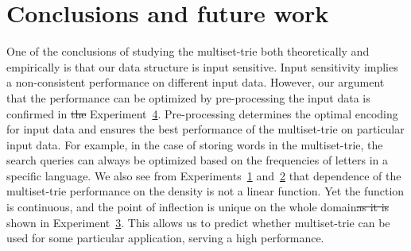 \documentclass[10pt,letterpaper]{article}
\providecommand{\DIFaddtex}[1]{{\protect\color{blue}\uwave{#1}}} %
\providecommand{\DIFdeltex}[1]{{\protect\color{red}\sout{#1}}}                      %
\providecommand{\DIFaddbegin}{} %
\providecommand{\DIFaddend}{} %
\providecommand{\DIFdelbegin}{} %
\providecommand{\DIFdelend}{} %
\providecommand{\DIFadd}[1]{\texorpdfstring{\DIFaddtex{#1}}{#1}} %
\providecommand{\DIFdel}[1]{\texorpdfstring{\DIFdeltex{#1}}{}} %
\newcommand{\DIFscaledelfig}{0.5}
\newlength{\DIFdelgraphicswidth} %
\newlength{\DIFdelgraphicsheight} %
\newcommand{\DIFaddincludegraphics}[2][]{{\color{blue}\fbox{\DIFOincludegraphics[#1]{#2}}}} %
\newcommand{\DIFdelincludegraphics}[2][]{%
\sbox{\DIFdelgraphicsbox}{\DIFOincludegraphics[#1]{#2}}%
\settoboxwidth{\DIFdelgraphicswidth}{\DIFdelgraphicsbox} %
\settoboxtotalheight{\DIFdelgraphicsheight}{\DIFdelgraphicsbox} %
\scalebox{\DIFscaledelfig}{%
\parbox[b]{\DIFdelgraphicswidth}{\usebox{\DIFdelgraphicsbox}\\[-\baselineskip] \rule{\DIFdelgraphicswidth}{0em}}\llap{\resizebox{\DIFdelgraphicswidth}{\DIFdelgraphicsheight}{%
\setlength{\unitlength}{\DIFdelgraphicswidth}%
\begin{picture}(1,1)%
\thicklines\linethickness{2pt} %
{\color[rgb]{1,0,0}\put(0,0){\framebox(1,1){}}}%
{\color[rgb]{1,0,0}\put(0,0){\line( 1,1){1}}}%
{\color[rgb]{1,0,0}\put(0,1){\line(1,-1){1}}}%
\end{picture}%
}\hspace*{3pt}}} %
} %
\DeclareRobustCommand{\DIFaddbegin}{\DIFOaddbegin \let\includegraphics\DIFaddincludegraphics} %
\DeclareRobustCommand{\DIFaddend}{\DIFOaddend \let\includegraphics\DIFOincludegraphics} %
\DeclareRobustCommand{\DIFdelbegin}{\DIFOdelbegin \let\includegraphics\DIFdelincludegraphics} %
\DeclareRobustCommand{\DIFdelend}{\DIFOaddend \let\includegraphics\DIFOincludegraphics} %
\begin{document}
\DIFdelend %
\section{Conclusions and future work} \label{c:conclusions}

%
One of the conclusions of studying the multiset-trie both theoretically and empirically is that our data structure is input sensitive. Input sensitivity implies a non-consistent performance on different input data. However, our argument that the performance can be optimized by pre-processing the input data is confirmed in  \DIFdelbegin \DIFdel{the }\DIFdelend Experiment~\hyperref[ss:exp3]{4}. Pre-processing determines the optimal encoding for input data and ensures the best performance of the multiset-trie on particular input data. For example, in the case of storing words in the multiset-trie, the search queries can always be optimized based on the frequencies of letters in a specific language. We also see from Experiments~\hyperref[s:exp1]{1} and~\hyperref[s:exp2]{2} that \DIFaddbegin \DIFadd{the }\DIFaddend dependence of the multiset-trie performance on the density is not a linear function. Yet the function is continuous, and the point of inflection is unique on the whole domain\DIFdelbegin \DIFdel{as it is }\DIFdelend \DIFaddbegin \DIFadd{, as }\DIFaddend shown in Experiment~\hyperref[s:exp3]{3}. This allows us to predict whether multiset-trie can be used for some particular application, serving a high performance. 
\end{document}
